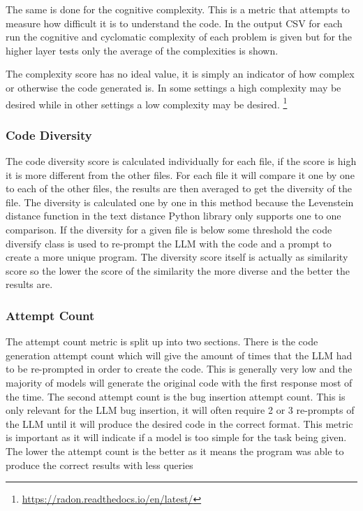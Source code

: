 \documentclass[12pt]{extarticle}
\begin{document}
The same is done for the cognitive complexity. This is a metric that attempts to measure how difficult it is to understand the code. In the output CSV for each run the cognitive and cyclomatic complexity of each problem is given but for the higher layer tests only the average of the complexities is shown. 

The complexity score has no ideal value, it is simply an indicator of how complex or otherwise the code generated is. In some settings a high complexity may be desired while in other settings a low complexity may be desired.
\footnote{\url{https://radon.readthedocs.io/en/latest/}}


\subsubsection{Code Diversity}

The code diversity score is calculated individually for each file, if the score is high it is more different from the other files. For each file it will compare it one by one to each of the other files, the results are then averaged to get the diversity of the file. The diversity is calculated one by one in this method because the Levenstein distance function in the text distance Python library only supports one to one comparison. If the diversity for a given file is below some threshold the code diversify class is used to re-prompt the LLM with the code and a prompt to create a more unique program. The diversity score itself is actually as similarity score so the lower the score of the similarity the more diverse and the better the results are.

\subsubsection{Attempt Count}

The attempt count metric is split up into two sections. There is the code generation attempt count which will give the amount of times that the LLM had to be re-prompted in order to create the code. This is generally very low and the majority of models will generate the original code with the first response most of the time. The second attempt count is the bug insertion attempt count. This is only relevant for the LLM bug insertion, it will often require 2 or 3 re-prompts of the LLM until it will produce the desired code in the correct format. This metric is important as it will indicate if a model is too simple for the task being given. The lower the attempt count is the better as it means the program was able to produce the correct results with less queries
\end{document}
